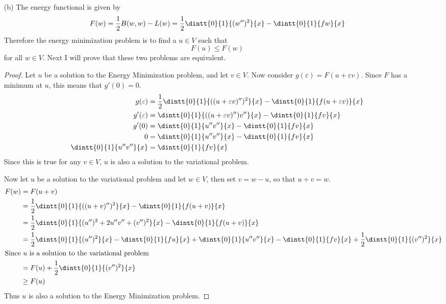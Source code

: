 \documentclass[11pt, oneside]{article}
\begin{document}
\begin{enumerate}
\begin{enumerate}
      \item[(b)] %
        The energy functional is given by
        \[
          F(w) = \frac{1}{2}B(w, w) - L(w) = \frac{1}{2}\dintt{0}{1}{(w'')^2}{x} - \dintt{0}{1}{fw}{x}
        \]
        Therefore the energy minimization problem is to find a $u \in V$ such that
        \[
          F(u) \le F(w)
        \]
        for all $w \in V$.
        Next I will prove that these two problems are equivalent.

        \begin{proof}
          Let $u$ be a solution to the Energy Minimization problem, and
          let $v \in V$.
          Now consider $g(\varepsilon) = F(u + \varepsilon v)$.
          Since $F$ has a minimum at $u$, this means that $g'(0) = 0$.
          \begin{align*}
            g(\varepsilon) &= \frac{1}{2}\dintt{0}{1}{((u + \varepsilon v)'')^2}{x} - \dintt{0}{1}{f(u + \varepsilon v)}{x} \\
            g'(\varepsilon) &= \dintt{0}{1}{((u + \varepsilon v)'')v''}{x} - \dintt{0}{1}{fv}{x} \\
            g'(0) &= \dintt{0}{1}{u''v''}{x} - \dintt{0}{1}{fv}{x} \\
            0 &= \dintt{0}{1}{u''v''}{x} - \dintt{0}{1}{fv}{x} \\
            \dintt{0}{1}{u''v''}{x} &= \dintt{0}{1}{fv}{x} \\
          \end{align*}
          Since this is true for any $v \in V$, $u$ is also a solution to the
          variational problem.

          Now let $u$ be a solution to the variational problem and let $w \in V$,
          then set $v = w - u$, so that $u + v = w$.
          \begin{align*}
            F(w) &= F(u + v) \\
            &= \frac{1}{2}\dintt{0}{1}{((u + v)'')^2}{x} - \dintt{0}{1}{f(u + v)}{x} \\
            &= \frac{1}{2}\dintt{0}{1}{(u'')^2 + 2u''v'' + (v'')^2}{x} - \dintt{0}{1}{f(u + v)}{x} \\
            &= \frac{1}{2}\dintt{0}{1}{(u'')^2}{x} - \dintt{0}{1}{fu}{x} + \dintt{0}{1}{u''v''}{x} - \dintt{0}{1}{fv}{x} + \frac{1}{2}\dintt{0}{1}{(v'')^2}{x} \\
            \intertext{Since $u$ is a solution to the variational problem}
            &= F(u) + \frac{1}{2}\dintt{0}{1}{(v'')^2}{x} \\
            &\ge F(u) \\
          \end{align*}
          Thus $u$ is also a solution to the Energy Minimization problem.
        \end{proof}


\end{enumerate}
\end{enumerate}
\end{document}
